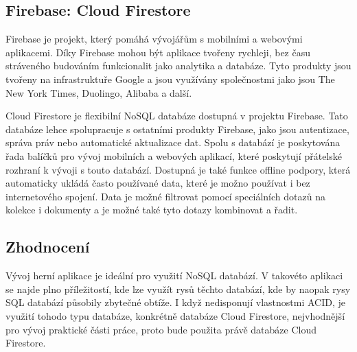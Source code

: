 \subsection{Firebase: Cloud Firestore}

Firebase je projekt,
který pomáhá vývojářům s mobilními a webovými aplikacemi.
Díky Firebase mohou být aplikace tvořeny rychleji,
bez času stráveného budováním funkcionalit jako analytika a databáze.
Tyto produkty jsou tvořeny na infrastruktuře Google
a jsou využívány společnostmi jako jsou The New York Times,
Duolingo, Alibaba a další.~\cite{firebase}

Cloud Firestore je flexibilní NoSQL databáze dostupná v projektu Firebase.
Tato databáze lehce spolupracuje s ostatními produkty Firebase,
jako jsou autentizace, správa práv nebo automatické aktualizace dat.
Spolu s databází je poskytována řada balíčků pro vývoj mobilních a webových
aplikací,
které poskytují přátelské rozhraní k vývoji s touto databází.
Dostupná je také funkce offline podpory,
která automaticky ukládá často používané data,
které je možno používat i bez internetového spojení.
Data je možné filtrovat pomocí speciálních dotazů na kolekce i dokumenty
a je možné také tyto dotazy kombinovat a řadit.~\cite{cloud_firestore}

\subsection{Zhodnocení}

Vývoj herní aplikace je ideální pro využití NoSQL databází.
V takovéto aplikaci se najde plno příležitostí,
kde lze využít rysů těchto databází,
kde by naopak rysy SQL databází působily zbytečné obtíže.
I když nedisponují vlastnostmi ACID,
je využití tohodo typu databáze,
konkrétně databáze Cloud Firestore,
nejvhodnější pro vývoj praktické části práce,
proto bude použita právě databáze Cloud Firestore.
